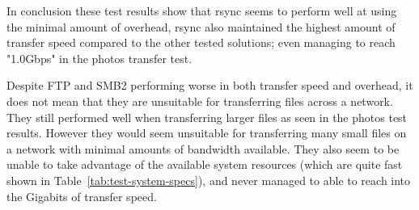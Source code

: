 In conclusion these test results show that rsync seems to perform well at using the minimal amount of overhead, rsync also maintained the highest amount of transfer speed compared to the other tested solutions; even managing to reach "1.0Gbps" in the photos transfer test.

Despite FTP and SMB2 performing worse in both transfer speed and overhead, it does not mean that they are unsuitable for transferring files across a network. They still performed well when transferring larger files as seen in the photos test results. However they would seem unsuitable for transferring many small files on a network with minimal amounts of bandwidth available. They also seem to be unable to take advantage of the available system resources (which are quite fast shown in Table~\ref{tab:test-system-specs}), and never managed to able to reach into the Gigabits of transfer speed.
